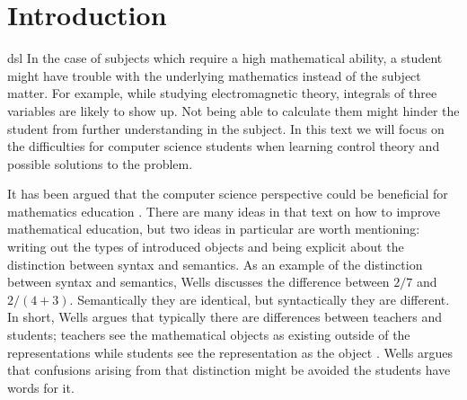 \section{Introduction}\label{intro}
\iffalse 
\todo[inline,color=other]{Presentera på ett intresseväckande sätt ämnet och tidigare forskning (både allmän pedagogisk forskning och sen även den specifika med patriks och de tidigare kandidatarbetena), bra att väva in källor här. Presentera vår ide och varför den behövs/är intressant. (Både kursspesifikt för eleverna som läser kursen men även mer allmänt att den är intressant för folk som är intresserade av pedagogik/didaktik aspekten och folk som vill göra liknande projekt. (Detta ger relevans till projektet och motiverar även läsaren att läsa vidare. (Osannolik att läsaren är en användare av materialet)). Presentera i detalj vad vår produkt är (skriva mer om reglerteknik specifikt (kan ta delar från 1.1 men inte allt, blir för långt) och beskriva vad rapporten kommer ta upp.}
\fi


\gls{dsl}
In the case of subjects which require a high mathematical ability, a student might have trouble with the underlying mathematics instead of the subject matter. For example, 
while studying electromagnetic theory, integrals of three variables are likely to show up. Not being able to calculate them might hinder the student from further understanding in the subject. 
In this text we will focus on the difficulties for computer science students when learning control theory and possible solutions to the problem. %

It has been argued that the computer science perspective could be beneficial for mathematics education \cite{wells1995communicating}. There are many ideas in that text on how to improve mathematical education, but two ideas in particular are worth mentioning: writing out the types of introduced objects and being explicit about the distinction between syntax and semantics. As an example of the distinction between syntax and semantics, Wells discusses the difference between $2/7$ and $2/(4+3)$. Semantically they are identical, but syntactically they are different. In short, Wells argues that typically there are differences between teachers and students; teachers see the mathematical objects as existing outside of the representations while students see the representation as the object \cite{wells1995communicating}. Wells argues that confusions arising from that distinction might be avoided the students have words for it.  

